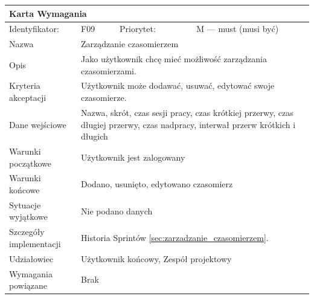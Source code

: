 \documentclass[a4paper,11pt]{report}
\begin{document}
		\begin{tabular}{|p{3cm}|p{2cm}|p{2cm}|p{6cm}|}
		\hline
		\multicolumn{4}{|p{12 cm}|}{Karta Wymagania}\\
		\hline
		Identyfikator: & F09 & Priorytet: & M — must (musi być)\\
		\hline
		Nazwa & \multicolumn{3}{|p{10 cm}|}{Zarządzanie czasomierzem}\\
		\hline
		Opis & \multicolumn{3}{|p{10 cm}|}{Jako użytkownik chcę mieć możliwość zarządzania czasomierzami.}\\
		\hline
		Kryteria akceptacji & \multicolumn{3}{|p{10 cm}|}{Użytkownik może dodawać, usuwać, edytować swoje czasomierze.}\\
		\hline
		Dane wejściowe & \multicolumn{3}{|p{10 cm}|}{Nazwa, skrót, czas sesji pracy, czas krótkiej przerwy, czas długiej przerwy, czas nadpracy, interwał przerw krótkich i długich}\\
		\hline
		Warunki początkowe & \multicolumn{3}{|p{10 cm}|}{Użytkownik jest zalogowany}\\
		\hline
		Warunki końcowe & \multicolumn{3}{|p{10 cm}|}{Dodano, usunięto, edytowano czasomierz}\\
		\hline
		Sytuacje wyjątkowe & \multicolumn{3}{|p{10 cm}|}{Nie podano danych}\\
		\hline
		Szczegóły implementacji & \multicolumn{3}{|p{10 cm}|}{Historia Sprintów \ref{sec:zarzadzanie_czasomierzem}.}\\
		\hline
		Udziałowiec & \multicolumn{3}{|p{10 cm}|}{Użytkownik końcowy, Zespół projektowy}\\
		\hline
		Wymagania powiązane & \multicolumn{3}{|p{10 cm}|}{Brak}\\
		\hline
		\end{tabular}\\
		\newline
		\vspace*{0,2 cm}
		\newline
\end{document}
